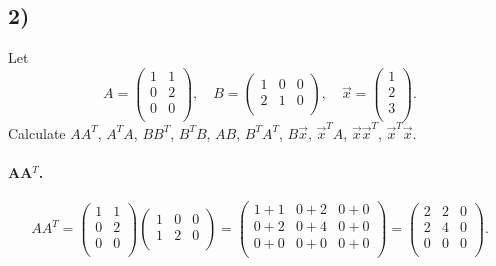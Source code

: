\subsection*{2)}
Let
\[ 
A = \begin{pmatrix}
1 & 1\\
0 & 2\\
0 & 0\\
\end{pmatrix}, \quad B = \begin{pmatrix}
1 & 0 & 0\\
2 & 1 & 0\\
\end{pmatrix}, \quad \Vec{x} = \begin{pmatrix}
1\\
2\\
3\\
\end{pmatrix}
.\]
Calculate $A A^T$, $A^T A$, $BB^{T}$, $B^{T}B$, $AB$, $B^{T}A^{T}$, $B \Vec{x}$, $\Vec{x}^{T}A$, $\Vec{x} \Vec{x}^{T}$, $\Vec{x}^{T} \Vec{x}$.

\paragraph{AA$^T$.}
\[ 
A A^{T}= \begin{pmatrix}
1 & 1\\
0 & 2\\
0 & 0\\
\end{pmatrix} \begin{pmatrix}
1 & 0 & 0\\
1 & 2 & 0\\
\end{pmatrix} = \begin{pmatrix}
1 + 1 & 0 + 2 & 0 + 0\\
0 + 2 & 0 + 4 & 0 + 0 \\
0 + 0 & 0 + 0 & 0 + 0\\
\end{pmatrix} = \begin{pmatrix}
2 & 2 & 0\\
2 & 4 & 0\\
0 & 0 & 0\\
\end{pmatrix}
.\]

